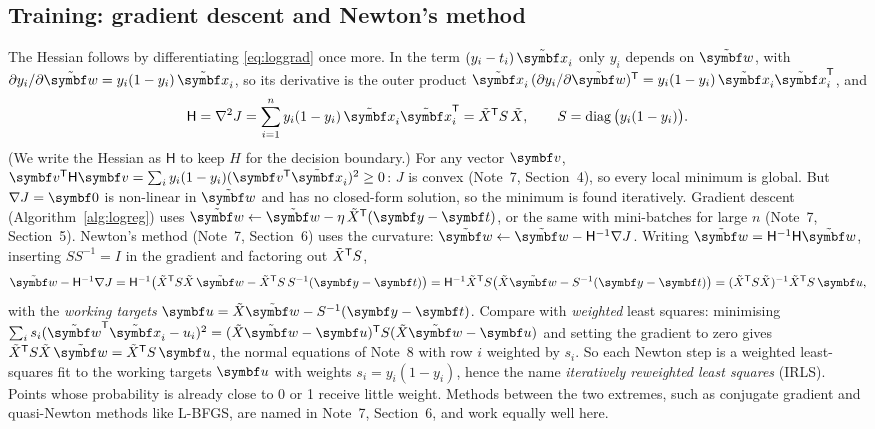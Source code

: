 \documentclass[11pt]{article}
\newcommand{\w}{\vect{w}}
\newcommand{\xt}{\tilde{\x}}
\newcommand{\wt}{\tilde{\w}}
\newcommand{\Xt}{\tilde X}
\newcommand{\Hess}{\mathsf{H}}
\begin{document}
\subsection{Training: gradient descent and Newton's method}

The Hessian follows by differentiating \eqref{eq:loggrad} once more. In the term $(y_i - t_i)\,\xt_i$ only $y_i$ depends on
$\wt$, with $\partial y_i/\partial\wt = y_i(1 - y_i)\,\xt_i$, so its derivative is the outer product $\xt_i\,(\partial
y_i/\partial\wt)\T = y_i(1 - y_i)\,\xt_i\xt_i\T$, and
\[
  \Hess = \nabla^2 J = \sum_{i=1}^n y_i(1 - y_i)\,\xt_i\xt_i\T = \Xt\T S\,\Xt, \qquad S = \operatorname{diag}\big(y_i(1 - y_i)\big) .
\]
(We write the Hessian as $\Hess$ to keep $H$ for the decision boundary.) For any vector $\vect{v}$, $\vect{v}\T \Hess\vect{v}
= \sum_i y_i(1 - y_i)(\vect{v}\T\xt_i)^2 \ge 0$: $J$ is convex (Note~7, Section~4), so every local minimum is global. But
$\nabla J = \vect{0}$ is non-linear in $\wt$ and has no closed-form solution, so the minimum is found iteratively. Gradient
descent (Algorithm~\ref{alg:logreg}) uses $\wt \gets \wt - \eta\,\Xt\T(\vect{y} - \vect{t})$, or the same with mini-batches
for large $n$ (Note~7, Section~5). Newton's method (Note~7, Section~6) uses the curvature: $\wt \gets \wt - \Hess^{-1}\nabla
J$. Writing $\wt = \Hess^{-1}\Hess\wt$, inserting $S S^{-1} = I$ in the gradient and factoring out $\Xt\T S$,
\[
  \wt - \Hess^{-1}\nabla J = \Hess^{-1}\big(\Xt\T S\Xt\,\wt - \Xt\T S\,S^{-1}(\vect{y} - \vect{t})\big)
  = \Hess^{-1}\Xt\T S\big(\Xt\wt - S^{-1}(\vect{y} - \vect{t})\big) = (\Xt\T S\Xt)^{-1}\Xt\T S\,\vect{u} ,
\]
with the \emph{working targets} $\vect{u} = \Xt\wt - S^{-1}(\vect{y} - \vect{t})$. Compare with \emph{weighted} least
squares: minimising $\sum_i s_i(\wt\T\xt_i - u_i)^2 = (\Xt\wt - \vect{u})\T S(\Xt\wt - \vect{u})$ and setting the gradient
to zero gives $\Xt\T S\Xt\,\wt = \Xt\T S\,\vect{u}$, the normal equations of Note~8 with row $i$ weighted by $s_i$. So each
Newton step is a weighted least-squares fit to the working targets $\vect{u}$ with weights $s_i = y_i(1 - y_i)$, hence the
name \emph{iteratively reweighted least squares} (IRLS). Points whose probability is already close to 0 or 1 receive little
weight. Methods between the two extremes, such as conjugate gradient and quasi-Newton methods like L-BFGS, are named in
Note~7, Section~6, and work equally well here.
\end{document}

